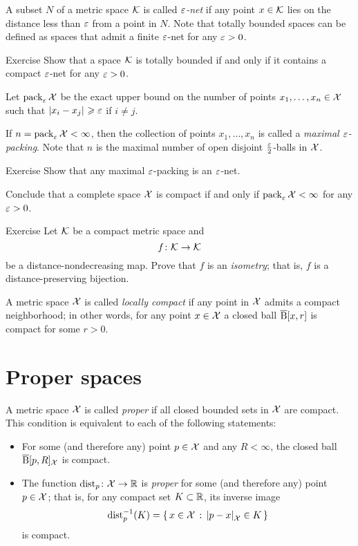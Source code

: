 A subset $N$ of a metric space $\mathcal{K}$ is called \emph{$\varepsilon$-net} if any point $x\in \mathcal{K}$ lies on the distance less than $\varepsilon$ from a point in $N$.
Note that totally bounded spaces can be defined as spaces that admit a finite $\varepsilon$-net for any $\varepsilon>0$.

\begin{thm}{Exercise}\label{ex:compact-net}
Show that a space $\mathcal{K}$ is totally bounded if and only if it contains a compact $\varepsilon$-net for any $\varepsilon>0$. 
\end{thm}


Let $\operatorname{\rm pack}\nolimits_\varepsilon\mathcal{X}$ be the exact upper bound on the number of points $x_1,\z\dots,x_n\in \spc{X}$ such that $\dist{x_i}{x_j}{}\ge\eps$ if $i\ne j$.

If $n=\operatorname{\rm pack}\nolimits_\varepsilon\mathcal{X}<\infty$, then
the collection of points $x_1,\dots,x_n$ is called a \emph{maximal $\varepsilon$-packing}.
Note that $n$ is the maximal number of open disjoint $\tfrac{\varepsilon}2$-balls in $\mathcal{X}$.

\begin{thm}{Exercise}\label{ex:pack-net}
Show that any maximal $\varepsilon$-packing is an $\varepsilon$-net.

Conclude that a complete space $\mathcal{X}$ is compact if and only if $\pack_\eps\spc{X}\z<\infty$ for any $\varepsilon>0$.
\end{thm}


\begin{thm}{Exercise}\label{ex:non-contracting-map}
Let $\mathcal{K}$  be a compact metric space and
\[f\:\spc{K}\z\to \spc{K}\] 
be a distance-nondecreasing map.
Prove that $f$ is an \emph{isometry};
that is, $f$ is a distance-preserving bijection.
\end{thm}

A metric space $\mathcal{X}$ is called \emph{locally compact} if any point in $\mathcal{X}$ admits a compact neighborhood;
in other words, for any point $x\in\mathcal{X}$ a closed ball $\overline{\mathrm{B}}{}[x,r]$ is compact for some $r>0$.

\section{Proper spaces}

A metric space $\mathcal{X}$ is called \emph{proper} if all closed bounded sets in $\mathcal{X}$ are compact. 
This condition is equivalent to each of the following statements:
\begin{itemize}
\item For some (and therefore any) point $p\in \mathcal{X}$ and any $R<\infty$, 
the closed ball $\overline{\mathrm{B}}{}[p,R]_{\mathcal{X}}$ is compact. 
\item The function $\mathrm{dist}_p\colon\mathcal{X}\to\mathbb{R}$ is \emph{proper} for some (and therefore any) point $p\in \mathcal{X}$;
that is, for any compact set $K\subset \mathbb{R}$, its inverse image 
\[\distfun_p^{-1}(K)=\set{x\in \spc{X}}{\dist{p}{x}{\spc{X}}\in K}\]
is compact.
\end{itemize}


